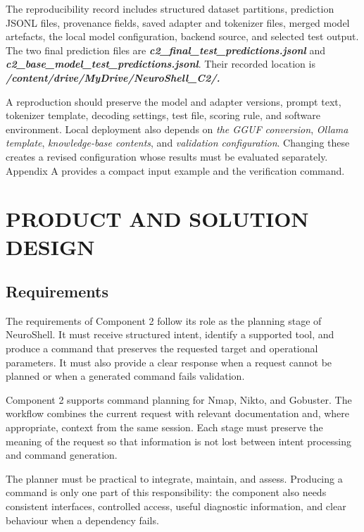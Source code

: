 \documentclass[
]{article}
\begin{document}
The reproducibility record includes structured dataset partitions,
prediction JSONL files, provenance fields, saved adapter and tokenizer
files, merged model artefacts, the local model configuration, backend
source, and selected test output. The two final prediction files are
\emph{\textbf{c2\_final\_test\_predictions.jsonl}} and
\emph{\textbf{c2\_base\_model\_test\_predictions.jsonl}}. Their recorded
location is \emph{\textbf{/content/drive/MyDrive/NeuroShell\_C2/.}}

A reproduction should preserve the model and adapter versions, prompt
text, tokenizer template, decoding settings, test file, scoring rule,
and software environment. Local deployment also depends on \emph{the
GGUF conversion}, \emph{Ollama template}, \emph{knowledge-base
contents}, and \emph{validation configuration}. Changing these creates a
revised configuration whose results must be evaluated separately.
Appendix A provides a compact input example and the verification
command.

\hypertarget{product-and-solution-design}{%
\section{PRODUCT AND SOLUTION
DESIGN}\label{product-and-solution-design}}

\hypertarget{requirements}{%
\subsection{Requirements}\label{requirements}}

The requirements of Component 2 follow its role as the planning stage of
NeuroShell. It must receive structured intent, identify a supported
tool, and produce a command that preserves the requested target and
operational parameters. It must also provide a clear response when a
request cannot be planned or when a generated command fails validation.

Component 2 supports command planning for Nmap, Nikto, and Gobuster. The
workflow combines the current request with relevant documentation and,
where appropriate, context from the same session. Each stage must
preserve the meaning of the request so that information is not lost
between intent processing and command generation.

The planner must be practical to integrate, maintain, and assess.
Producing a command is only one part of this responsibility: the
component also needs consistent interfaces, controlled access, useful
diagnostic information, and clear behaviour when a dependency fails.
\end{document}
